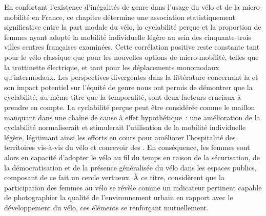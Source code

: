 \begin{refsegment}
En confortant l'existence d'inégalités de genre dans l'usage du vélo et de la micro-mobilité en France, ce chapitre détermine une association statistiquement significative entre la part modale du vélo, la cyclabilité perçue et la proportion de femmes ayant adopté la mobilité individuelle légère au sein des cinquante-trois villes centres françaises examinées. Cette corrélation positive reste constante tant pour le vélo classique que pour les nouvelles options de micro-mobilité, telles que la trottinette électrique, et tant pour les déplacements monomodaux qu'intermodaux. Les perspectives divergentes dans la littérature concernant la  et son impact potentiel sur l'équité de genre nous ont permis de démontrer que la cyclabilité, au même titre que la temporalité, sont deux facteurs cruciaux à prendre en compte. La cyclabilité perçue peut être considérée comme le maillon manquant dans une chaîne de cause à effet hypothétique~: une amélioration de la cyclabilité normaliserait et stimulerait l'utilisation de la mobilité individuelle légère, légitimant ainsi les efforts en cours pour améliorer l'hospitalité des territoires vis-à-vis du vélo et concevoir des  \textcolor{blue}{\autocite[10]{bourdeau-lepage_reveler_2022}}. En conséquence, les femmes sont alors en capacité d'adopter le vélo au fil du temps en raison de la sécurisation, de la démocratisation et de la présence généralisée du vélo dans les espaces publics, composant de ce fait un cercle vertueux. À ce titre, \textcolor{blue}{\textcite[64]{garrard_revolutions_2006}} considèrent que la participation des femmes au vélo se révèle comme un indicateur pertinent capable de photographier la qualité de l'environnement urbain en rapport avec le développement du vélo, ces éléments se renforçant mutuellement.%


\end{refsegment}
